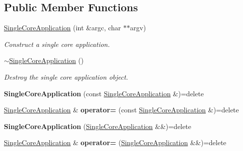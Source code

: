 \subsection*{Public Member Functions}
\begin{DoxyCompactItemize}
\item 
\hyperlink{class_mdt_1_1_single_core_application_a18493beac6e321df7852571ed4a55205}{Single\+Core\+Application} (int \&argc, char $\ast$$\ast$argv)
\begin{DoxyCompactList}\small\item\em Construct a single core application. \end{DoxyCompactList}\item 
\hyperlink{class_mdt_1_1_single_core_application_ab3a61d6e1a5b36be02de6eba1c2f3867}{$\sim$\+Single\+Core\+Application} ()
\begin{DoxyCompactList}\small\item\em Destroy the single core application object. \end{DoxyCompactList}\item 
{\bfseries Single\+Core\+Application} (const \hyperlink{class_mdt_1_1_single_core_application}{Single\+Core\+Application} \&)=delete\hypertarget{class_mdt_1_1_single_core_application_a3e0683245258cb0aacf53af2976e54b1}{}\label{class_mdt_1_1_single_core_application_a3e0683245258cb0aacf53af2976e54b1}

\item 
\hyperlink{class_mdt_1_1_single_core_application}{Single\+Core\+Application} \& {\bfseries operator=} (const \hyperlink{class_mdt_1_1_single_core_application}{Single\+Core\+Application} \&)=delete\hypertarget{class_mdt_1_1_single_core_application_a1b20009662a270d9522c26b1e5d160fa}{}\label{class_mdt_1_1_single_core_application_a1b20009662a270d9522c26b1e5d160fa}

\item 
{\bfseries Single\+Core\+Application} (\hyperlink{class_mdt_1_1_single_core_application}{Single\+Core\+Application} \&\&)=delete\hypertarget{class_mdt_1_1_single_core_application_ae95bdbe03d440d8a344bdfe7b9f5802e}{}\label{class_mdt_1_1_single_core_application_ae95bdbe03d440d8a344bdfe7b9f5802e}

\item 
\hyperlink{class_mdt_1_1_single_core_application}{Single\+Core\+Application} \& {\bfseries operator=} (\hyperlink{class_mdt_1_1_single_core_application}{Single\+Core\+Application} \&\&)=delete\hypertarget{class_mdt_1_1_single_core_application_a268b15bee0658b536afa3c7bdf0ea48e}{}\label{class_mdt_1_1_single_core_application_a268b15bee0658b536afa3c7bdf0ea48e}


\end{DoxyCompactItemize}

